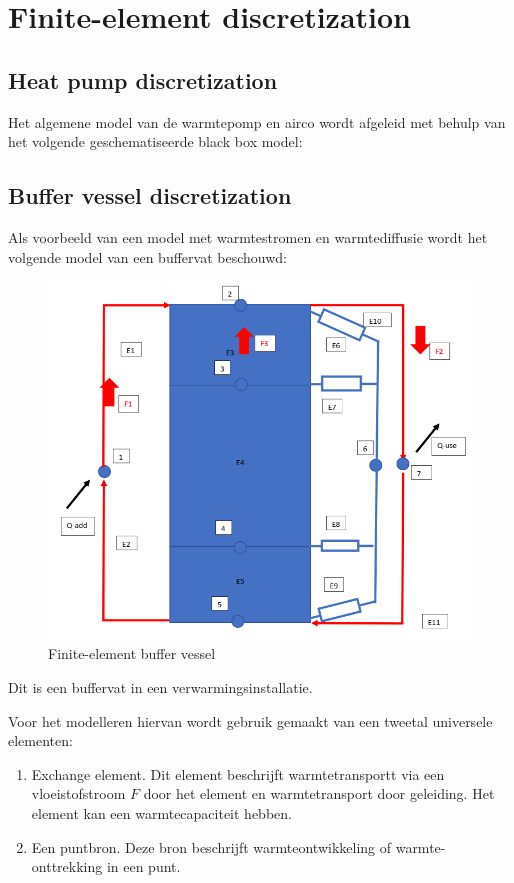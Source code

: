 \section{Finite-element discretization}

\subsection{Heat pump discretization}

Het algemene model van de warmtepomp en airco wordt afgeleid met behulp van het volgende geschematiseerde black box model:

\subsection{Buffer vessel discretization}

Als voorbeeld van een model met warmtestromen en warmtediffusie wordt het volgende model van
een buffervat beschouwd:

\begin{figure}[H]
	\centering
	\includegraphics[width=0.7\columnwidth]{Pictures/FEwatervat.png}
	\caption[Short title]{Finite-element buffer vessel}
	\label{fig:FEbuffervessel}
\end{figure}

Dit is een buffervat in een verwarmingsinstallatie.

Voor het modelleren hiervan wordt gebruik gemaakt van een tweetal universele elementen:

\begin{enumerate}
	\item Exchange element. Dit element beschrijft warmtetransportt via een vloeistofstroom $F$ door het element en warmtetransport door geleiding. Het element kan een warmtecapaciteit
	hebben.
	\item Een puntbron. Deze bron beschrijft warmteontwikkeling of warmte-onttrekking in een punt.
\end{enumerate}


